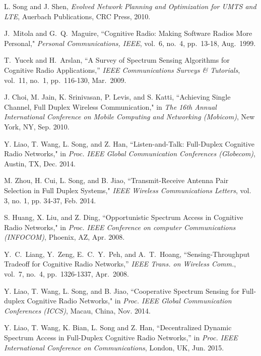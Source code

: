 \documentclass[onecolumn,12pt]{IEEEtran}
\begin{document}
\newpage
\begin{thebibliography}{10}

L. Song and J. Shen, \emph{Evolved Network Planning and Optimization for UMTS and LTE}, Auerbach Publications, CRC Press, 2010.

J.~Mitola and G.~Q.~Maguire, ``Cognitive Radio: Making Software Radios More Personal," \emph{Personal Communications, IEEE}, vol.~6, no.~4, pp.~13-18, Aug.~1999.



T.~Yucek and H.~Arslan, ``A Survey of Spectrum Sensing Algorithms for Cognitive Radio Applications,'' \emph{IEEE Communications Surveys \& Tutorials}, vol.~11, no.~1, pp.~116-130, Mar.~2009.

J. Choi, M. Jain, K. Srinivasan, P. Levis, and S. Katti, ``Achieving Single Channel, Full Duplex Wireless Communication," in \emph{The 16th Annual International Conference on Mobile Computing and Networking (Mobicom)}, New York, NY, Sep. 2010.



Y. Liao, T. Wang, L. Song, and Z. Han, ``Listen-and-Talk: Full-Duplex Cognitive Radio Networks," in \emph{Proc. IEEE Global Communication Conferences (Globecom)}, Austin, TX, Dec. 2014.



M. Zhou, H. Cui, L. Song, and B. Jiao, ``Transmit-Receive Antenna Pair Selection in Full Duplex Systems," \emph{IEEE Wireless Communications Letters}, vol. 3, no. 1, pp. 34-37, Feb. 2014.



S. Huang, X. Liu, and Z. Ding, ``Opportunistic Spectrum Access in Cognitive Radio Networks," in \emph{Proc. IEEE Conference on computer Communications (INFOCOM)}, Phoenix, AZ, Apr. 2008.

Y.~C.~Liang, Y.~Zeng, E.~C.~Y.~Peh, and A.~T.~Hoang, ``Sensing-Throughput Tradeoff for Cognitive Radio Networks,'' \emph{IEEE Trans. on Wireless Comm.}, vol.~7, no.~4, pp.~1326-1337, Apr.~2008.

Y. Liao, T. Wang, L. Song, and B. Jiao, ``Cooperative Spectrum Sensing for Full-duplex Cognitive Radio Networks," in \emph{Proc. IEEE Global Communication Conferences (ICCS)}, Macau, China, Nov. 2014.



Y. Liao, T. Wang, K. Bian, L. Song and Z. Han, ``Decentralized Dynamic Spectrum Access in Full-Duplex Cognitive Radio Networks,'' in \emph{Proc. IEEE International Conference on Communications}, London, UK, Jun. 2015.


\end{thebibliography}
\end{document}
